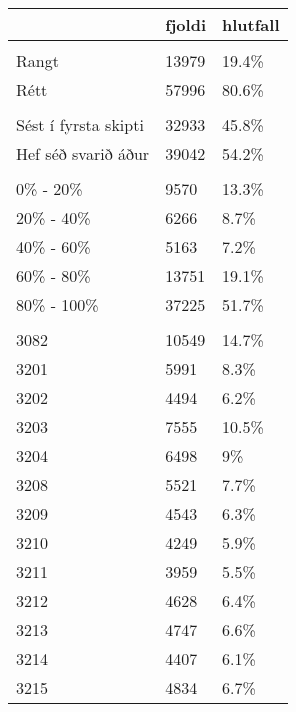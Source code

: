 \documentclass[
  12pt,
]{article}
\begin{document}
\begin{longtable}{>{\raggedright\arraybackslash}p{4cm}ll}
\toprule
  & fjoldi & hlutfall\\
\midrule
\addlinespace[0.3em]
\multicolumn{3}{l}{\textbf{correct}}\\
\hspace{1em}Rangt & 13979 & 19.4\%\\
\hspace{1em}Rétt & 57996 & 80.6\%\\
\addlinespace[0.3em]
\multicolumn{3}{l}{\textbf{hsta}}\\
\hspace{1em}Sést í fyrsta skipti & 32933 & 45.8\%\\
\hspace{1em}Hef séð svarið áður & 39042 & 54.2\%\\
\addlinespace[0.3em]
\multicolumn{3}{l}{\textbf{hluta2}}\\
\hspace{1em}0\% - 20\% & 9570 & 13.3\%\\
\hspace{1em}20\% - 40\% & 6266 & 8.7\%\\
\hspace{1em}40\% - 60\% & 5163 & 7.2\%\\
\hspace{1em}60\% - 80\% & 13751 & 19.1\%\\
\hspace{1em}80\% - 100\% & 37225 & 51.7\%\\
\addlinespace[0.3em]
\multicolumn{3}{l}{\textbf{lectureId}}\\
\hspace{1em}3082 & 10549 & 14.7\%\\
\hspace{1em}3201 & 5991 & 8.3\%\\
\hspace{1em}3202 & 4494 & 6.2\%\\
\hspace{1em}3203 & 7555 & 10.5\%\\
\hspace{1em}3204 & 6498 & 9\%\\
\hspace{1em}3208 & 5521 & 7.7\%\\
\hspace{1em}3209 & 4543 & 6.3\%\\
\hspace{1em}3210 & 4249 & 5.9\%\\
\hspace{1em}3211 & 3959 & 5.5\%\\
\hspace{1em}3212 & 4628 & 6.4\%\\
\hspace{1em}3213 & 4747 & 6.6\%\\
\hspace{1em}3214 & 4407 & 6.1\%\\
\hspace{1em}3215 & 4834 & 6.7\%\\
\bottomrule
\end{longtable}
\end{document}
